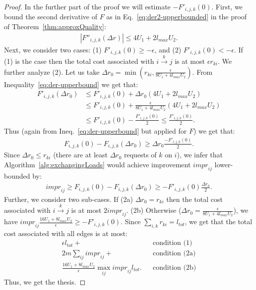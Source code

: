 \documentclass[11pt]{article}
\newcommand{\ltot}{{{l_{\mathit{tot}}}}}
\newcommand{\impr}{{{\mathit{impr}}}}
\newcommand{\lmax}{{{l_{\mathit{max}}}}}
\begin{document}
\begin{proof}
In the further part of the proof we will estimate $-F'_{i, j, k}(0)$.
First, we bound the second derivative of $F$ as in Eq.~\ref{eq:der2-upperbounded} in the proof of Theorem~\ref{thm:approxQuality}:
\begin{align*}
|F''_{i, j, k}(\Delta r)| \leq 4U_1 + 2\lmax U_2 \textrm{.}
\end{align*}
Next, we consider two cases: (1) $F'_{i, j, k}(0) \geq -\epsilon$, and (2) $F'_{i, j, k}(0) < -\epsilon$. If (1) is the case then the total cost associated with $i \xrightarrow{k} j$ is at most $\epsilon r_{ki}$. We further analyze (2). Let us take $\Delta r_0 = \min(r_{ki}, \frac{\epsilon}{8U_1 + 4\lmax U_2})$. From Inequality~\ref{eq:der-upperbound} we get that: 
\begin{align*}
F'_{i, j, k}(\Delta r_0) &\leq F'_{i, j, k}(0) + \Delta r_0(4U_1 + 2\lmax U_2) \\
 & \leq F'_{i, j, k}(0) +\frac{\epsilon}{8U_1 + 4\lmax U_2}(4U_1 + 2\lmax U_2)  \\
& \leq F'_{i,j,k}(0) - \frac{F'_{i, j, k}(0)}{2} \leq \frac{F'_{i, j, k}(0)}{2} \textrm{.}
\end{align*}
Thus (again from Ineq.~\ref{eq:der-upperbound} but applied for $F$) we get that:
\begin{align*}
F_{i, j, k}(0) - F_{i, j, k}(\Delta r_0) \geq \Delta r_0 \frac{-F'_{i, j, k}(0)}{2} \text{.}
\end{align*}
Since $\Delta r_0 \leq r_{ki}$ (there are at least $\Delta r_0$ requests of $k$ on $i$), we infer that Algorithm~\ref{alg:exchangingLoads} would achieve improvement $\impr_{ij}$ lower-bounded by:
\begin{align*}
\impr_{ij} \geq F_{i, j, k}(0) - F_{i, j, k}(\Delta r_0) \geq  -F'_{i, j, k}(0)\frac{\Delta r_0}{2} \text{.}
\end{align*}
Further, we consider two sub-cases. If (2a) $\Delta r_0 = r_{ki}$ then the total cost associated with $i \xrightarrow{k} j$ is at most $2\impr_{ij}$. (2b) Otherwise ($\Delta r_0 = \frac{\epsilon}{8U_1 + 4\lmax U_2}$), we have $\impr_{ij} \frac{16U_1 + 8\lmax U_2}{\epsilon} \geq -F'_{i, j, k}(0)$.
Since $\sum_{i,k}r_{ki} = \ltot$, we get that the total cost associated with all edges is at most:
\begin{align*}
\epsilon \ltot + && \text{condition (1)} \\
2m \sum_{ij} \impr_{ij} + && \text{condition (2a)} \\
\frac{16U_1 + 8\lmax U_2}{\epsilon} \max_{ij} \impr_{ij} \ltot \text{.} && \text{condition (2b)}
\end{align*}
Thus, we get the thesis. 
\end{proof}
\end{document}
